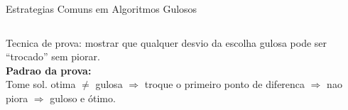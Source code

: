 \documentclass[aspectratio=169,10pt]{beamer}
\begin{document}
\begin{frame}[shrink=2]{Estrategias Comuns em Algoritmos Gulosos}
\begin{columns}[t]
      \vspace{0.1cm}
      \begin{tcolorbox}[caixaLaranja,title={4. Intercambio (Exchange)}]
        \footnotesize
        Tecnica de prova: mostrar que qualquer
        desvio da escolha gulosa pode ser
        ``trocado'' sem piorar.\\[3pt]
        \textbf{Padrao da prova:}\\
        Tome sol. otima $\neq$ gulosa $\Rightarrow$ troque
        o primeiro ponto de diferenca $\Rightarrow$
        nao piora $\Rightarrow$ guloso e ótimo.
      \end{tcolorbox}
  \end{columns}
\end{frame}

\end{document}
